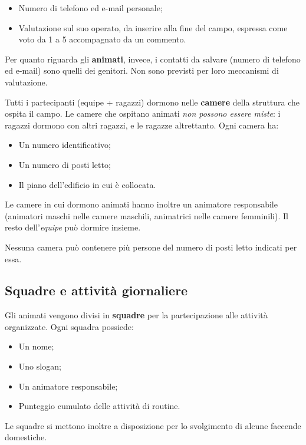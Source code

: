 \documentclass[11pt,a4paper]{article}
\begin{document}
\begin{itemize}[nosep]
  \item Numero di telefono ed e-mail personale;
  \item Valutazione sul suo operato, da inserire alla fine del campo, espressa come voto da 1 a 5
    accompagnato da un commento.
\end{itemize}

Per quanto riguarda gli \textbf{animati}, invece, i contatti da salvare (numero di telefono ed
e-mail) sono quelli dei genitori. Non sono previsti per loro meccanismi di valutazione.

Tutti i partecipanti (equipe + ragazzi) dormono nelle \textbf{camere} della struttura che ospita
il campo. Le camere che ospitano animati \emph{non possono essere miste}: i ragazzi dormono con
altri ragazzi, e le ragazze altrettanto. Ogni camera ha:

\begin{itemize}[nosep]
  \item Un numero identificativo;
  \item Un numero di posti letto;
  \item Il piano dell'edificio in cui è collocata.
\end{itemize}

Le camere in cui dormono animati hanno inoltre un animatore responsabile (animatori maschi
nelle camere maschili, animatrici nelle camere femminili). Il resto dell'\textit{equipe} può
dormire insieme.

Nessuna camera può contenere più persone del numero di posti letto indicati per essa.

\subsection{Squadre e attività giornaliere}

Gli animati vengono divisi in \textbf{squadre} per la partecipazione alle attività organizzate.
Ogni squadra possiede:

\begin{itemize}[nosep]
  \item Un nome;
  \item Uno slogan;
  \item Un animatore responsabile;
  \item Punteggio cumulato delle attività di routine.
\end{itemize}

Le squadre si mettono inoltre a disposizione per lo svolgimento di alcune faccende domestiche.
\end{document}
